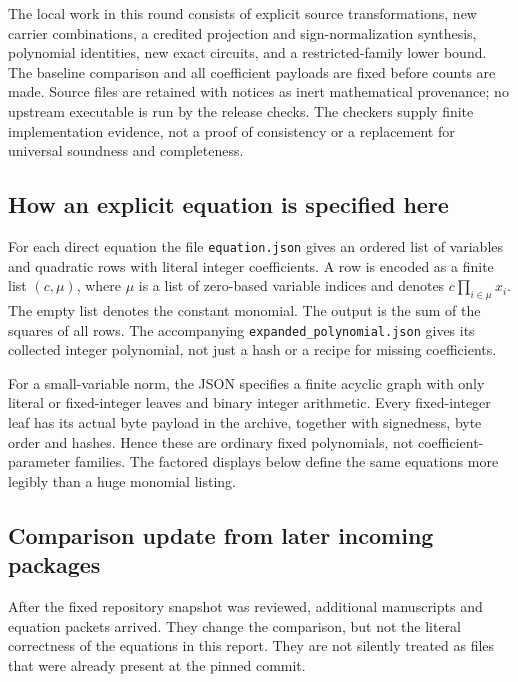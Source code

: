\documentclass[11pt]{article}
\begin{document}
The local work in this round consists of explicit source transformations,
new carrier combinations, a credited projection and sign-normalization
synthesis, polynomial identities, new exact circuits,
and a restricted-family lower bound. The baseline comparison and all
coefficient payloads are fixed before counts are made. Source files are
retained with notices as inert mathematical provenance; no upstream
executable is run by the release checks. The checkers supply finite
implementation evidence, not a proof of consistency or a replacement
for universal soundness and completeness.

\subsection{How an explicit equation is specified here}
For each direct equation the file \texttt{equation.json} gives an ordered
list of variables and quadratic rows with literal integer coefficients.
A row is encoded as a finite list $(c,\mu)$, where $\mu$ is a list of
zero-based variable indices and denotes $c\prod_{i\in\mu}x_i$.
The empty list denotes the constant monomial. The output is the sum of
the squares of all rows. The accompanying
\texttt{expanded\_polynomial.json} gives its collected integer polynomial,
not just a hash or a recipe for missing coefficients.

For a small-variable norm, the JSON specifies a finite acyclic graph with
only literal or fixed-integer leaves and binary integer arithmetic. Every
fixed-integer leaf has its actual byte payload in the archive, together
with signedness, byte order and hashes. Hence these are ordinary fixed
polynomials, not coefficient-parameter families. The factored displays
below define the same equations more legibly than a huge monomial listing.


\subsection{Comparison update from later incoming packages}
After the fixed repository snapshot was reviewed, additional manuscripts
and equation packets arrived. They change the comparison, but not the
literal correctness of the equations in this report. They are not silently
treated as files that were already present at the pinned commit.
\end{document}

